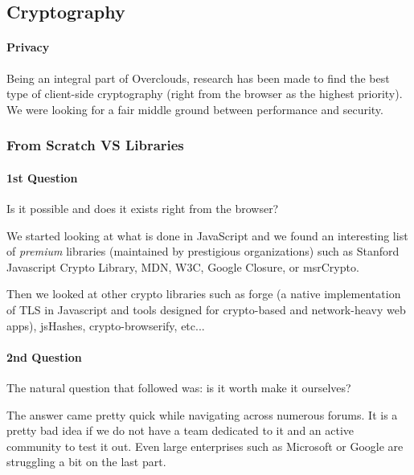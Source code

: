 
\subsection{Cryptography}
\paragraph{Privacy} Being an integral part of Overclouds, research has been made to find the best type of client-side cryptography (right from the browser as the highest priority). We were looking for a fair middle ground between performance and security.

\subsubsection{From Scratch VS Libraries}
\paragraph{1st Question} Is it possible and does it exists right from the browser?

We started looking at what is done in JavaScript and we found an interesting list of \textit{premium} libraries (maintained by prestigious organizations) such as Stanford Javascript Crypto Library\cite{Stark2009SymmetricJavascript}, MDN\cite{MDN2015MDNCrypto}, W3C\cite{Sleevi2014WebAPI}, Google Closure\cite{Google2015ClosureLibrary}, or msrCrypto\cite{Microsoft2015MSRLibrary}.

Then we looked at other crypto libraries such as forge\cite{DigitalBazaar2016Forge} (a native implementation of TLS in Javascript and tools designed for crypto-based and network-heavy web apps), jsHashes\cite{Johnston2015JsHashes}, crypto-browserify\cite{Tarr2013Crypto-Browserify}, etc...

\paragraph{2nd Question} The natural question that followed was: is it worth make it ourselves?

The answer came pretty quick while navigating across numerous forums. It is a pretty bad idea if we do not have a team dedicated to it and an active community to test it out. Even large enterprises such as Microsoft or Google are struggling a bit on the last part.


